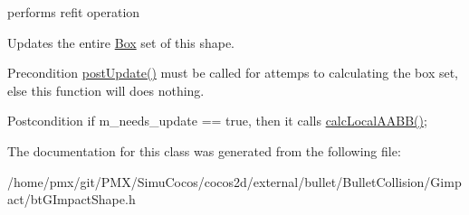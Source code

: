 performs refit operation 

Updates the entire \hyperlink{classBox}{Box} set of this shape. \begin{DoxyPrecond}{Precondition}
\hyperlink{classbtGImpactShapeInterface_ac430754948ac92d6f70b81e88416c96a}{post\+Update()} must be called for attemps to calculating the box set, else this function will does nothing. 
\end{DoxyPrecond}
\begin{DoxyPostcond}{Postcondition}
if m\+\_\+needs\+\_\+update == true, then it calls \hyperlink{classbtGImpactShapeInterface_a1712a4613e20aa9249514dcd97f0a086}{calc\+Local\+A\+A\+B\+B()}; 
\end{DoxyPostcond}


The documentation for this class was generated from the following file\+:\begin{DoxyCompactItemize}
\item 
/home/pmx/git/\+P\+M\+X/\+Simu\+Cocos/cocos2d/external/bullet/\+Bullet\+Collision/\+Gimpact/bt\+G\+Impact\+Shape.\+h\end{DoxyCompactItemize}
